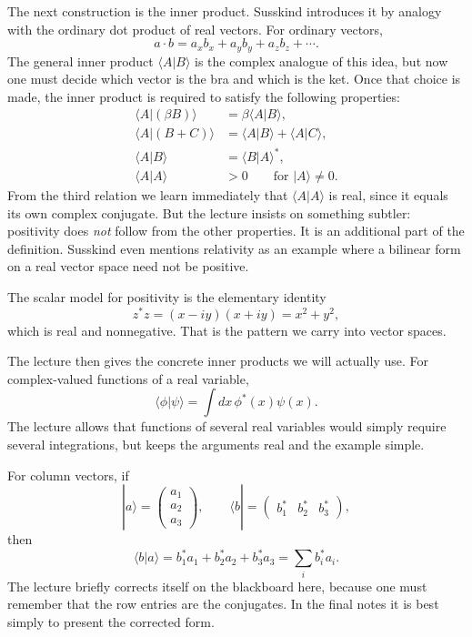 The next construction is the inner product. Susskind introduces it by analogy with the ordinary dot product of real vectors. For ordinary vectors,
\begin{equation}
a \cdot b = a_x b_x + a_y b_y + a_z b_z + \cdots.
\end{equation}
The general inner product \(\langle A|B\rangle\) is the complex analogue of this idea, but now one must decide which vector is the bra and which is the ket. Once that choice is made, the inner product is required to satisfy the following properties:
\begin{align}
\langle A|(\beta B)\rangle &= \beta \langle A|B\rangle,\\
\langle A|(B+C)\rangle &= \langle A|B\rangle + \langle A|C\rangle,\\
\langle A|B\rangle &= \langle B|A\rangle^*,\\
\langle A|A\rangle &> 0 \qquad \text{for } |A\rangle \neq 0.
\end{align}
From the third relation we learn immediately that \(\langle A|A\rangle\) is real, since it equals its own complex conjugate. But the lecture insists on something subtler: positivity does \emph{not} follow from the other properties. It is an additional part of the definition. Susskind even mentions relativity as an example where a bilinear form on a real vector space need not be positive.

The scalar model for positivity is the elementary identity
\begin{equation}
z^* z = (x-iy)(x+iy) = x^2 + y^2,
\end{equation}
which is real and nonnegative. That is the pattern we carry into vector spaces.

The lecture then gives the concrete inner products we will actually use. For complex-valued functions of a real variable,
\begin{equation}
\langle \phi|\psi\rangle = \int dx\, \phi^*(x)\psi(x).
\end{equation}
The lecture allows that functions of several real variables would simply require several integrations, but keeps the arguments real and the example simple.

For column vectors, if
\begin{equation}
|a\rangle
=
\left(
\begin{array}{c}
a_1\\
a_2\\
a_3
\end{array}
\right),
\qquad
\langle b|
=
\left(
\begin{array}{ccc}
b_1^* & b_2^* & b_3^*
\end{array}
\right),
\end{equation}
then
\begin{equation}
\langle b|a\rangle = b_1^* a_1 + b_2^* a_2 + b_3^* a_3 = \sum_i b_i^* a_i.
\end{equation}
The lecture briefly corrects itself on the blackboard here, because one must remember that the row entries are the conjugates. In the final notes it is best simply to present the corrected form.

